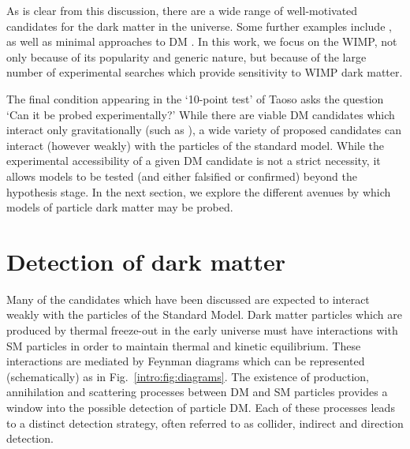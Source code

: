 As is clear from this discussion, there are a wide range of well-motivated candidates for the dark matter in the universe. Some further examples include , as well as minimal approaches to DM \cite{Cirelli:2007}. In this work, we focus on the WIMP, not only because of its popularity and generic nature, but because of the large number of experimental searches which provide sensitivity to WIMP dark matter. 


The final condition appearing in the `10-point test' of Taoso \etal asks the question `Can it be probed experimentally?' While there are viable DM candidates which interact only gravitationally (such as ), a wide variety of proposed candidates can interact (however weakly) with the particles of the standard model. While the experimental accessibility of a given DM candidate is not a strict necessity, it allows models to be tested (and either falsified or confirmed) beyond the hypothesis stage. In the next section, we explore the different avenues by which models of particle dark matter may be probed.

\section{Detection of dark matter}

Many of the candidates which have been discussed are expected to interact weakly with the particles of the Standard Model. Dark matter particles which are produced by thermal freeze-out in the early universe must have interactions with SM  particles in order to maintain thermal and kinetic equilibrium. These interactions are mediated by Feynman diagrams which can be represented (schematically) as in Fig.~\ref{intro:fig:diagrams}. The existence of production, annihilation and scattering processes between DM and SM particles provides a window into the possible detection of particle DM. Each of these processes leads to a distinct detection strategy, often referred to as collider, indirect and direction detection.

